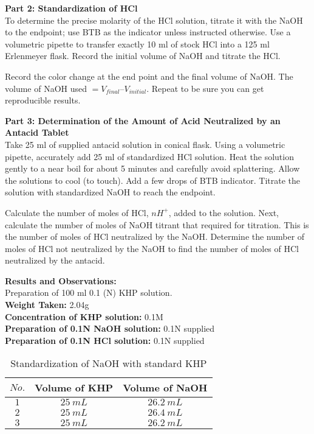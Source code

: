 \documentclass[12pt]{article}
\begin{document}
	\textbf{Part 2: Standardization of HCl}\\[14pt]
	To determine the precise molarity of the HCl solution, titrate it with the NaOH to the endpoint; use BTB as the indicator 
	unless instructed otherwise. Use a volumetric pipette to transfer exactly 10 ml of stock HCl into a 125 ml Erlenmeyer 
	flask. Record the initial volume of NaOH and titrate the HCl.
	
	Record the color change at the end point and the final volume of NaOH. The volume of NaOH used $= V_{final}–V_{initial}.$
	Repeat to be sure you can get reproducible results.
	
	\textbf{Part 3: Determination of the Amount of Acid Neutralized by an Antacid Tablet}\\[14pt]
	Take 25 ml of supplied antacid solution in conical flask. Using a volumetric pipette, accurately add 25 ml of standardized HCl solution. Heat the solution gently to a near boil for about 5 minutes and carefully avoid splattering. Allow the solutions to cool (to touch). Add a few drops of BTB indicator. Titrate the solution with standardized NaOH to reach the endpoint.
	
	Calculate the number of moles of HCl, $nH^{+}$, added to the solution. Next, calculate the number of moles of NaOH 
	titrant that required for titration. This is the number of moles of HCl neutralized by the NaOH. Determine the number of moles of HCl not neutralized by the NaOH to find the number of moles of HCl neutralized 
	by the antacid.
	
	\pagebreak
	
	\textbf{Results and Observations: }\\[16pt]
	Preparation of 100 ml 0.1 (N) KHP solution.\\[14pt]
	\textbf{Weight Taken: }2.04g\\
	\textbf{Concentration of KHP solution: }0.1M\\
	\textbf{Preparation of 0.1N NaOH solution: }0.1N supplied\\
	\textbf{Preparation of 0.1N HCl solution: }0.1N supplied\\
	
		\begin{table}[H]
		\centering
		\def\arraystretch{1.5}
		\begin{tabular}{|c||c|c|}
			\hline
			$No.$&Volume of KHP&Volume of NaOH\\
			\hline
			\hline
			$1$&$25\ mL$&$26.2\ mL$\\
			\hline
			$2$&$25\ mL$&$26.4\ mL$\\
			\hline
			$3$&$25\ mL$&$26.2\ mL$\\
			\hline
		\end{tabular}
		\caption{Standardization of NaOH with standard KHP}
		\label{tab:std_NaOH}
	\end{table}
\end{document}

